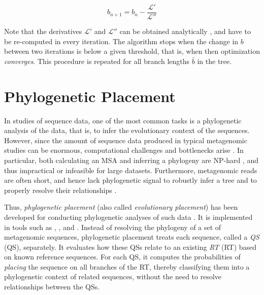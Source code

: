\begin{equation}
    \label{ch:Foundations:sec:MLTreeInference:eq:BLO}
    b_{n+1} = b_n - \frac{ \mathcal{L}' }{ \mathcal{L}'' }
\end{equation}

Note that the derivatives $\mathcal{L}'$ and $\mathcal{L}''$ can be obtained analytically \cite{Yang2014},
and have to be re-computed in every iteration.
The algorithm stops when the change in $b$ between two iterations is below a given threshold,
that is, when then optimization \emph{converges}.
This procedure is repeated for all branch lengths $\bar{b}$ in the tree.


\section{Phylogenetic Placement}
\label{ch:Foundations:sec:PhylogeneticPlacement}

In studies of sequence data, one of the most common tasks is a phylogenetic analysis of the data,
that is, to infer the evolutionary context of the sequences.
However, since the amount of sequence data produced in typical metagenomic studies can be enormous,
computational challenges and bottlenecks arise \cite{Scholz2012}.
In particular, both calculating an MSA and inferring a phylogeny are NP-hard \cite{Just2001,Chor2005},
and thus impractical or infeasible for large datasets.
Furthermore, metagenomic reads are often short, and hence lack phylogenetic signal
to robustly infer a tree and to properly resolve their relationships \cite{Matsen2010,Janssen2018}.

Thus, \emph{phylogenetic placement}  (also called \emph{evolutionary placement})
has been developed for conducting phylogenetic analyses of such data \cite{VonMering2007,Monier2008}.
It is implemented in tools such as
 \cite{Matsen2010},  \cite{Berger2011}, and  \cite{Barbera2018}.
Instead of resolving the phylogeny of a set of metagenomic sequences,
phylogenetic placement treats each sequence, called a \emph{\acl{QS}} (\acs{QS}), separately.
It evaluates how these \acp{QS} relate to an existing \emph{\acl{RT}} (\acs{RT}) based on known reference sequences.
For each \ac{QS}, it computes the probabilities of \emph{placing} the sequence on all branches of the \ac{RT},
thereby classifying them into a phylogenetic context of related sequences,
without the need to resolve relationships between the \acp{QS}.

